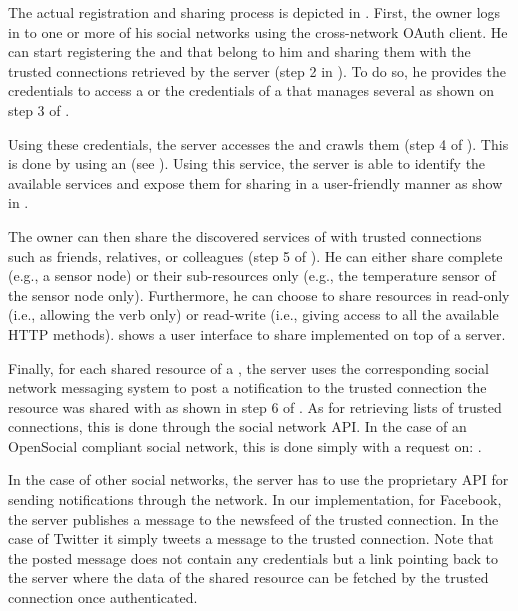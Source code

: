 The actual registration and sharing process is depicted in . First, the owner logs in to one or more of his social networks using the \sac{} cross-network OAuth client. He can start registering the \sts{} and \sgs{} that belong to him and sharing them with the trusted connections retrieved by the \sac{} server (step 2 in ). To do so, he provides the credentials to access a \st{} or the credentials of a \sg{} that manages several \sts{} as shown on step 3 of . 

Using these credentials, the \sac{} server accesses the \sts{} and crawls them (step 4 of ). This is done by using an \transService{} (see ). Using this service, the \sac{} server is able to identify the available services and expose them for sharing in a user-friendly manner as show in .

The owner can then share the discovered services of \sts{} with trusted connections such as friends, relatives, or colleagues (step 5 of ). He can either share complete \sts{} (e.g., a sensor node) or their sub-resources only (e.g., the temperature sensor of the sensor node only). Furthermore, he can choose to share resources in read-only (i.e., allowing the  verb only) or read-write (i.e., giving access to all the available HTTP methods).  shows a user interface to share \sts{} implemented on top of a \sac{} server.  

Finally, for each shared resource of a \st{}, the \sac{} server uses the corresponding social network messaging system to post a notification to the trusted connection the resource was shared with as shown in step 6 of . As for retrieving lists of trusted connections, this is done through the social network API. In the case of an OpenSocial compliant social network, this is done simply with a  request on:
.

In the case of other social networks, the \sac{} server has to use the proprietary API for sending notifications through the network. In our implementation, for Facebook, the \sac{} server publishes a message to the newsfeed of the trusted connection. In the case of Twitter it simply tweets a message to the trusted connection. Note that the posted message does not contain any credentials but a link pointing back to the \sac{} server where the data of the shared resource can be fetched by the trusted connection once authenticated.

